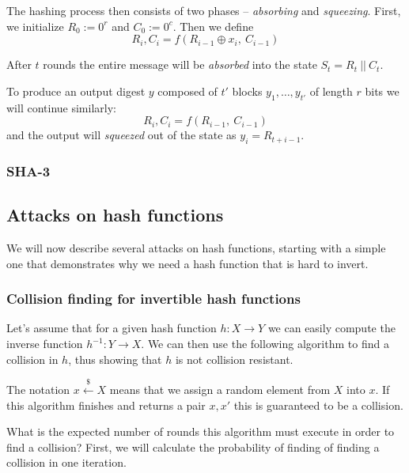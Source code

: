 The hashing process then consists of two phases -- \emph{absorbing} and \emph{squeezing}.
First, we initialize $R_0 := 0^r$ and $C_0 := 0^c$. Then we define
\[
R_i, C_i = f(R_{i-1} \oplus x_i,~ C_{i-1})
\]

After $t$ rounds the entire message will be \emph{absorbed} into the state $S_t = R_t ~||~ C_t$.

To produce an output digest $y$ composed of $t'$ blocks $y_1, \dots, y_{t'}$ of length $r$ bits we will continue similarly:
\[
R_i, C_i = f(R_{i-1},~ C_{i-1})
\]
and the output will \emph{squeezed} out of the state as $y_i = R_{t+i-1}$.

\subsubsection{SHA-3}

\subsection{Attacks on hash functions}

We will now describe several attacks on hash functions, starting with a simple one that demonstrates why we need a hash function that is hard to invert.

\subsubsection{Collision finding for invertible hash functions}

Let's assume that for a given hash function $h: X \to Y$ we can easily compute the inverse function $h^{-1}: Y \to X$.
We can then use the following algorithm to find a collision in $h$, thus showing that $h$ is not collision resistant.

\begin{algorithm}
\begin{algorithmic}[1]
			\State {}
		\EndIf
	\EndWhile
\end{algorithmic}
\end{algorithm}

The notation $x \overset{\$}{\gets} X$ means that we assign a random element from $X$ into $x$.
If this algorithm finishes and returns a pair $x, x'$ this is guaranteed to be a collision.

What is the expected number of rounds this algorithm must execute in order to find a collision?
First, we will calculate the probability of finding of finding a collision in one iteration.

